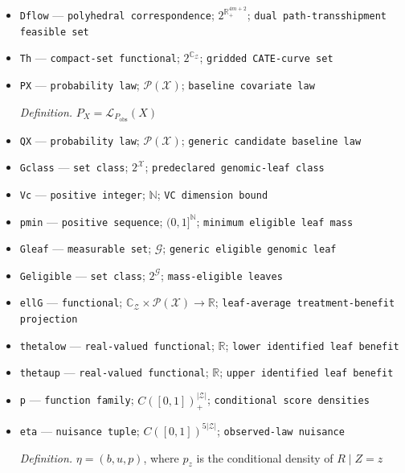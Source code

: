 \documentclass{article}
\begin{document}
\begin{itemize}
  \item \texttt{Dflow} --- \texttt{polyhedral correspondence}; \(2^{\mathbb R_+^{4m+2}}\); \texttt{dual path-\allowbreak{}transshipment feasible set}
  \item \texttt{Th} --- \texttt{compact-\allowbreak{}set functional}; \(2^{\mathbb C_{\mathcal Z}}\); \texttt{gridded CATE-\allowbreak{}curve set}
  \item \texttt{PX} --- \texttt{probability law}; \(\mathcal P(\mathcal X)\); \texttt{baseline covariate law}
  \par\smallskip\noindent\emph{Definition.} \(P_X=\mathcal L_{P_{\mathrm{obs}}}(X)\)
  \item \texttt{QX} --- \texttt{probability law}; \(\mathcal P(\mathcal X)\); \texttt{generic candidate baseline law}
  \item \texttt{Gclass} --- \texttt{set class}; \(2^{\mathcal X}\); \texttt{predeclared genomic-\allowbreak{}leaf class}
  \item \texttt{Vc} --- \texttt{positive integer}; \(\mathbb N\); \texttt{VC dimension bound}
  \item \texttt{pmin} --- \texttt{positive sequence}; \((0,1]^{\mathbb N}\); \texttt{minimum eligible leaf mass}
  \item \texttt{Gleaf} --- \texttt{measurable set}; \(\mathcal G\); \texttt{generic eligible genomic leaf}
  \item \texttt{Geligible} --- \texttt{set class}; \(2^{\mathcal G}\); \texttt{mass-\allowbreak{}eligible leaves}
  \item \texttt{ellG} --- \texttt{functional}; \(\mathbb C_{\mathcal Z}\times\mathcal P(\mathcal X)\to\mathbb R\); \texttt{leaf-\allowbreak{}average treatment-\allowbreak{}benefit projection}
  \item \texttt{thetalow} --- \texttt{real-\allowbreak{}valued functional}; \(\mathbb R\); \texttt{lower identified leaf benefit}
  \item \texttt{thetaup} --- \texttt{real-\allowbreak{}valued functional}; \(\mathbb R\); \texttt{upper identified leaf benefit}
  \item \texttt{p} --- \texttt{function family}; \(C([0,1])_+^{|\mathcal Z|}\); \texttt{conditional score densities}
  \item \texttt{eta} --- \texttt{nuisance tuple}; \(C([0,1])^{5|\mathcal Z|}\); \texttt{observed-\allowbreak{}law nuisance}
  \par\smallskip\noindent\emph{Definition.} \(\eta=(b,u,p)\), where \(p_z\) is the conditional density of \(R\mid Z=z\)

\end{itemize}
\end{document}
